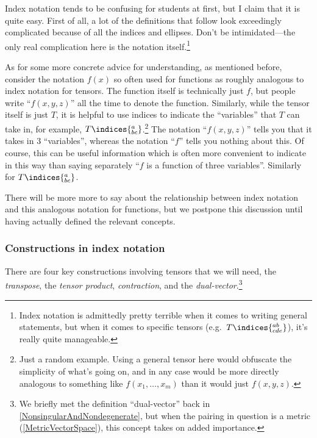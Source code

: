 Index notation tends to be confusing for students at first, but I claim that it is quite easy.  First of all, a lot of the definitions that follow look exceedingly complicated because of all the indices and ellipses.  Don't be intimidated---the only real complication here is the notation itself.\footnote{Index notation is admittedly pretty terrible when it comes to writing general statements, but when it comes to specific tensors (e.g.~$T\indices{^{ab}_{cde}}$), it's really quite manageable.}

As for some more concrete advice for understanding, as mentioned before, consider the notation $f(x)$ so often used for functions as roughly analogous to index notation for tensors.  The function itself is technically just $f$, but people write ``$f(x,y,z)$'' all the time to denote the function.  Similarly, while the tensor itself is just $T$, it is helpful to use indices to indicate the ``variables'' that $T$ can take in, for example, $T\indices{^a_{bc}}$.\footnote{Just a random example.  Using a general tensor here would obfuscate the simplicity of what's going on, and in any case would be more directly analogous to something like $f(x_1,\ldots ,x_m)$ than it would just $f(x,y,z)$.}   The notation ``$f(x,y,z)$'' tells you that it takes in $3$ ``variables'', whereas the notation ``$f$'' tells you nothing about this.  Of course, this can be useful information which is often more convenient to indicate in this way than saying separately ``$f$ is a function of three variables''.  Similarly for $T\indices{^a_{bc}}$.

There will be more more to say about the relationship between index notation and this analogous notation for functions, but we postpone this discussion until having actually defined the relevant concepts.

\subsubsection{Constructions in index notation}

There are four key constructions involving tensors that we will need, the \emph{transpose}, the \emph{tensor product}, \emph{contraction}, and the \emph{dual-vector}.\footnote{We briefly met the definition ``dual-vector'' back in \cref{NonsingularAndNondegenerate}, but when the pairing in question is a metric (\cref{MetricVectorSpace}), this concept takes on added importance.}

